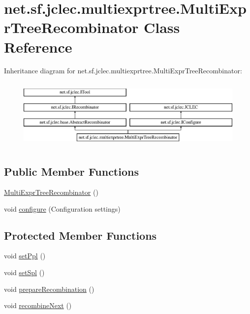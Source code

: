 \hypertarget{classnet_1_1sf_1_1jclec_1_1multiexprtree_1_1_multi_expr_tree_recombinator}{\section{net.\-sf.\-jclec.\-multiexprtree.\-Multi\-Expr\-Tree\-Recombinator Class Reference}
\label{classnet_1_1sf_1_1jclec_1_1multiexprtree_1_1_multi_expr_tree_recombinator}
}
Inheritance diagram for net.\-sf.\-jclec.\-multiexprtree.\-Multi\-Expr\-Tree\-Recombinator\-:\begin{figure}[H]
\begin{center}
\leavevmode
\includegraphics[height=3.522013cm]{classnet_1_1sf_1_1jclec_1_1multiexprtree_1_1_multi_expr_tree_recombinator}
\end{center}
\end{figure}
\subsection*{Public Member Functions}
\begin{DoxyCompactItemize}
\item 
\hyperlink{classnet_1_1sf_1_1jclec_1_1multiexprtree_1_1_multi_expr_tree_recombinator_ab39bbe37433f8c8e6aff748f04774c6d}{Multi\-Expr\-Tree\-Recombinator} ()
\item 
void \hyperlink{classnet_1_1sf_1_1jclec_1_1multiexprtree_1_1_multi_expr_tree_recombinator_adf190851ba69d247d2ca85948201fff6}{configure} (Configuration settings)
\end{DoxyCompactItemize}
\subsection*{Protected Member Functions}
\begin{DoxyCompactItemize}
\item 
void \hyperlink{classnet_1_1sf_1_1jclec_1_1multiexprtree_1_1_multi_expr_tree_recombinator_a98be6bca45d872a9e2aaa9b69213464b}{set\-Ppl} ()
\item 
void \hyperlink{classnet_1_1sf_1_1jclec_1_1multiexprtree_1_1_multi_expr_tree_recombinator_a0ff8446d96f37f89b17eb96fbea6a272}{set\-Spl} ()
\item 
void \hyperlink{classnet_1_1sf_1_1jclec_1_1multiexprtree_1_1_multi_expr_tree_recombinator_ad080cb3d90d8144a88809a308a7157cf}{prepare\-Recombination} ()
\item 
void \hyperlink{classnet_1_1sf_1_1jclec_1_1multiexprtree_1_1_multi_expr_tree_recombinator_a2b32688791c7f1669a5a3dfe5b440b51}{recombine\-Next} ()
\end{DoxyCompactItemize}

